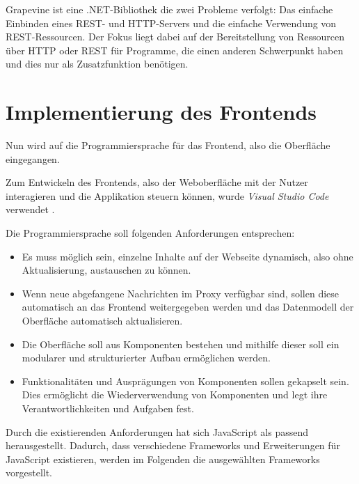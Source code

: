     Grapevine ist eine .NET-Bibliothek die zwei Probleme verfolgt: Das einfache Einbinden eines REST- und HTTP-Servers und die einfache Verwendung von REST-Ressourcen.
    Der Fokus liegt dabei auf der Bereitstellung von Ressourcen über HTTP oder REST für Programme, die einen anderen Schwerpunkt haben und dies nur als Zusatzfunktion benötigen.
    
\section{Implementierung des Frontends}
    
    Nun wird auf die Programmiersprache für das Frontend, also die Oberfläche eingegangen.
    
    Zum Entwickeln des Frontends, also der Weboberfläche mit der Nutzer interagieren und die Applikation steuern können, wurde \emph{Visual Studio Code} verwendet \cite{microsoft_2016}.
    
Die Programmiersprache soll folgenden Anforderungen entsprechen:
    \begin{itemize}
        \item Es muss möglich sein, einzelne Inhalte auf der Webseite dynamisch, also ohne Aktualisierung, austauschen zu können.
        \item Wenn neue abgefangene Nachrichten im Proxy verfügbar sind, sollen diese automatisch an das Frontend weitergegeben werden und das Datenmodell der Oberfläche automatisch aktualisieren.
        \item Die Oberfläche soll aus Komponenten bestehen und mithilfe dieser soll ein modularer und strukturierter Aufbau ermöglichen werden.
        \item Funktionalitäten und Ausprägungen von Komponenten sollen gekapselt sein. Dies ermöglicht die Wiederverwendung von Komponenten und legt ihre Verantwortlichkeiten und Aufgaben fest.
    \end{itemize}
    
    Durch die existierenden Anforderungen hat sich JavaScript als passend herausgestellt. Dadurch, dass verschiedene Frameworks und Erweiterungen für JavaScript existieren, werden im Folgenden die ausgewählten Frameworks vorgestellt.
    
